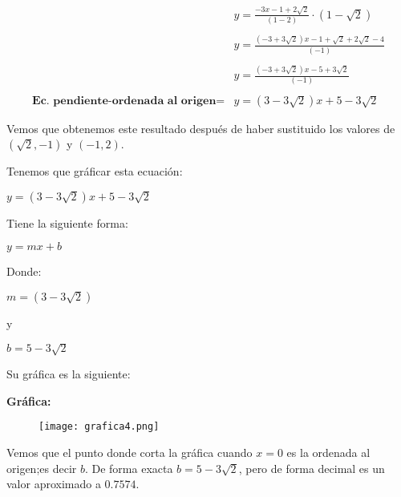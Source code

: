 \documentclass[12pt]{article}
\begin{document}
\begin{equation}
    \begin{split}
         & y =\frac{-3x - 1+2\sqrt{2}}{(1-2)}\cdot {(1-\sqrt{2})}\\\\ 
        & y = \frac{(-3+3\sqrt{2})x - 1+\sqrt{2}+2\sqrt{2} -4}{(-1)}\\\\ 
         & y = \frac{(-3+3\sqrt{2})x - 5+3\sqrt{2}}{(-1)}\\\\\textbf{Ec. pendiente-ordenada al origen} 
        = & y = {(3-3\sqrt{2})x + 5-3\sqrt{2}}\\\\
    \end{split}
    \end{equation}
Vemos que obtenemos este resultado después de haber sustituido los valores de $(\sqrt{2},-1)$ y $(-1,2)$. 
\begin{center}
 Tenemos que gráficar esta ecuación:  
\end{center}

\begin{center}
    $y = {(3-3\sqrt{2})x + 5-3\sqrt{2}}$
\end{center}
\begin{center}
 Tiene la siguiente forma: 
\end{center}
\begin{center}
 $y=mx+b$
\end{center}
\begin{center}
 Donde: 
\end{center}
\begin{center}
$m={(3-3\sqrt{2})}$
\end{center}
\begin{center}
y
\end{center}
\begin{center}
$b=5-3\sqrt{2}$
\end{center}
Su gráfica es la siguiente:
\newpage

\textbf{Gráfica:} 

\begin{figure}[htb] \centering \texttt{[image: grafica4.png]} \end{figure}

Vemos que el punto donde corta la gráfica cuando $x=0$ es la ordenada al origen;es decir $b$. De forma exacta $b=5-3\sqrt{2}$, pero de forma decimal es un valor aproximado a $0.7574$.\\\\\\
\end{document}
